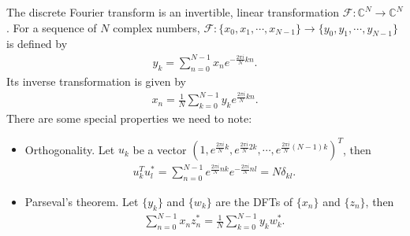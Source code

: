 \documentclass{article}
\begin{document}
The discrete Fourier transform is an invertible, linear transformation $\mathcal{F}:\mathbb{C}^N \rightarrow \mathbb{C}^N$. For a sequence of $N$ complex numbers, $\mathcal{F}:\{x_0, x_1, \cdots, x_{N-1}\}\rightarrow \{y_0, y_1, \cdots,y_{N-1}\}$ is defined by
\begin{align}
	y_k = \sum_{n=0}^{N-1} x_n e^{-\frac{2\pi i}{N}kn}.
\end{align}
Its inverse transformation is given by
\begin{align}
	x_n = \frac{1}{N}\sum_{k=0}^{N-1} y_k e^{\frac{2\pi i}{N}kn}.
\end{align}
There are some special properties we need to note:
\begin{itemize}
	\item Orthogonality. Let $u_k$ be a vector $  (1, e^{\frac{2\pi i}{N}k},e^{\frac{2\pi i}{N}2k},\cdots,e^{\frac{2\pi i}{N}(N-1)k})^T$, then 
	\begin{align}
		u_k^T u_l^*= \sum_{n=0}^{N-1} e^{\frac{2\pi i}{N}nk}e^{-\frac{2\pi i}{N}nl}= N \delta_{kl}.
	\end{align}

	\item Parseval's theorem. Let $\{y_k\}$ and $\{w_k\}$ are the DFTs of $\{x_n\}$ and $\{z_n\}$, then
	\begin{align}
		\sum_{n=0}^{N-1}x_n z_n^* = \frac{1}{N} \sum_{k=0}^{N-1} y_k w_k^*.
	\end{align}
\end{itemize}
\end{document}

